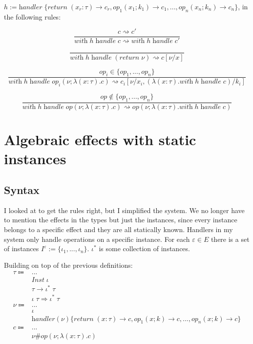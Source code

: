\documentclass[12pt]{article}
\newcommand\eff[0]{\varepsilon}
\newcommand\steffs[0]{E}
\newcommand\eop[0]{\textit{op}}
\newcommand\insts[1]{I^{#1}}
\newcommand\inst[0]{\iota}
\newcommand\instss[0]{\inst^*}
\newcommand\type[0]{\tau}
\newcommand\tarre[3]{#1 \rightarrow #2 \; #3}
\newcommand\thandler[4]{#1 \; #2 \Rightarrow #3 \; #4}
\newcommand\tinst[1]{\textit{Inst} \; #1}
\newcommand\val[0]{\nu}
\newcommand\vabs[3]{\lambda(#1 : #2) . #3}
\newcommand\vhandler[1]{\textit{handler} \; \{#1\}}
\newcommand\vhandleri[2]{\textit{handler} (#1) \{#2\}}
\newcommand\vhandlerci[1]{\vhandleri{#1}{
	\textit{return} \; (x : \type) \rightarrow \comp,
	\eop_1(x ; k) \rightarrow \comp,
	...,
	\eop_n(x ; k) \rightarrow \comp
}}
\newcommand\comp[0]{c}
\newcommand\creturn[1]{\textit{return} \; #1}
\newcommand\cop[5]{#1(#2 ; \lambda (#3 : #4) . #5)}
\newcommand\copi[6]{#1 \# #2(#3 ; \lambda (#4:#5) . #6)}
\newcommand\chandle[2]{\textit{with} \; #1 \; \textit{handle} \; #2}
\begin{document}
\vspace{20pt}
$h := \vhandler{
		\textit{return} \; (x_r : \type) \rightarrow \comp_r,
		\eop_1 (  x_1 ; k_1 ) \rightarrow \comp_1,
		...,
		\eop_n ( x_n ; k_n ) \rightarrow \comp_n
	}$, in the following rules:\\
	
\begin{minipage}{0.5\textwidth}
\[\frac{
	\comp \rightsquigarrow \comp'
}{
	\chandle{h}{\comp} \rightsquigarrow \chandle{h}{\comp'}
}\]
\end{minipage}
\begin{minipage}{0.5\textwidth}
\[\frac{
}{
	\chandle{h}{(\creturn{\val})} \rightsquigarrow \comp[\val / x]
}\]
\end{minipage}
\vspace{20pt}
\[\frac{
	\eop_i \in \{ \eop_1, ..., \eop_n \}
}{
	\chandle{h}{\cop{\eop_i}{\val}{x}{\type}{\comp}} \rightsquigarrow \comp_i[\val / x_i, (\vabs{x}{\type}{\chandle{h}{\comp}}) / k_i]
}\]

\[\frac{
	\eop \notin \{ \eop_1, ..., \eop_n \}
}{
	\chandle{h}{\cop{\eop}{\val}{x}{\type}{\comp}} \rightsquigarrow \cop{\eop}{\val}{x}{\type}{\chandle{h}{\comp}}
}\]



\newpage
\section{Algebraic effects with static instances}

\subsection{Syntax}
I looked at \cite{effectsystem} to get the rules right, but I simplified the system.
We no longer have to mention the effects in the types but just the instances, since every instance belongs to a specific effect and they are all statically known.
Handlers in my system only handle operations on a specific instance. For each $\eff \in \steffs$ there is a set of instances $\insts{\eff} := \{ \inst_1, ..., \inst_n \}$.
$\instss$ is some collection of instances.

Building on top of the previous definitions:
\begin{align*}
	\type \Coloneqq 	& ...							\tag{types} \\
				& \tinst{\inst}					\tag{type of instances} \\
				& \tarre{\type}{\instss}{\type}			\tag{type of functions} \\
				& \thandler{\inst}{\type}{\instss}{\type}	\tag{type of handlers} \\
	\val \Coloneqq	& ...							\tag{values} \\
				& \inst							\tag{instance} \\
				& \vhandlerci{\val}					\tag{handler} \\
	\comp \Coloneqq	& ...							\tag{computations} \\
				& \copi{\val}{\eop}{\val}{x}{\type}{\comp}	\tag{operation call} \\
\end{align*}
\end{document}
